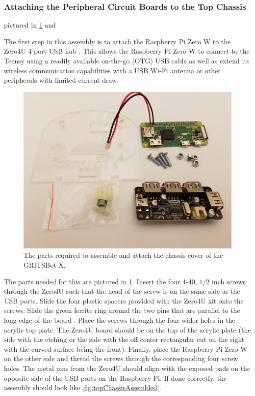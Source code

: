 \subsubsection{Attaching the Peripheral Circuit Boards to the Top Chassis}
\label{sec:attachZero4U}

pictured in \cref{fig:topPlateMaterials} and

The first step in this assembly is to attach the Raspberry Pi Zero W \cite{raspberryPiZeroW} to the Zero4U 4-port USB hub \cite{zero4u}. This allows the Raspberry Pi Zero W to connect to the Teensy using a readily available on-the-go (OTG) USB cable as well as extend its wireless communication capabilities with a USB Wi-Fi antenna or other peripherals with limited current draw.

\begin{figure}[h!]
\centering
\includegraphics[width=0.65\columnwidth, keepaspectratio]{./figs/20190107_091402.jpg}
\caption{The parts required to assemble and attach the chassis cover of the GRITSBot X.}
\label{fig:topPlateMaterials}
\end{figure}

The parts needed for this are pictured in \cref{fig:topPlateMaterials}. Insert the four 4-40, $1/2$ inch screws through the Zero4U such that the head of the screw is on the same side as the USB ports. Slide the four plastic spacers provided with  the Zero4U kit onto the screws. Slide the green ferrite ring around the two pins that are parallel to the long edge of the board \cite{zero4uRing}. Place the screws through the four wider holes in the acrylic top plate. The Zero4U board should be on the top of the acrylic plate (the side with the etching or the side with the off center rectangular cut on the right with the curved surface being the front). Finally, place the Raspberry Pi Zero W on the other side and thread the screws through the corresponding four screw holes. The metal pins from the Zero4U should align with the exposed pads on the opposite side of the USB ports on the Raspberry Pi. If done correctly, the assembly should look like \cref{fig:topChassisAssembled}.

